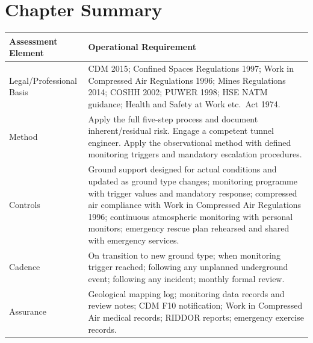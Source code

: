 
\newpage
\section{Chapter Summary}

\begin{table}[H]
\centering
\begin{tabularx}{\textwidth}{>{\raggedright\arraybackslash}p{3.2cm}X}
\toprule
\textbf{Assessment Element} & \textbf{Operational Requirement} \\
\midrule
Legal/Professional Basis & CDM 2015; Confined Spaces Regulations 1997; Work in Compressed Air Regulations 1996; Mines Regulations 2014; COSHH 2002; PUWER 1998; HSE NATM guidance; Health and Safety at Work etc.\ Act 1974. \\
Method & Apply the full five-step process and document inherent/residual risk. Engage a competent tunnel engineer. Apply the observational method with defined monitoring triggers and mandatory escalation procedures. \\
Controls & Ground support designed for actual conditions and updated as ground type changes; monitoring programme with trigger values and mandatory response; compressed air compliance with Work in Compressed Air Regulations 1996; continuous atmospheric monitoring with personal monitors; emergency rescue plan rehearsed and shared with emergency services. \\
Cadence & On transition to new ground type; when monitoring trigger reached; following any unplanned underground event; following any incident; monthly formal review. \\
Assurance & Geological mapping log; monitoring data records and review notes; CDM F10 notification; Work in Compressed Air medical records; RIDDOR reports; emergency exercise records. \\
\bottomrule
\end{tabularx}
\end{table}

